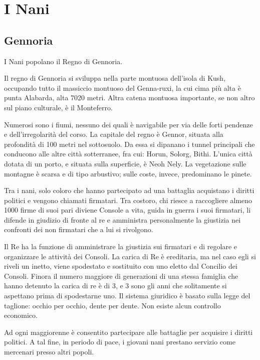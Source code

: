 \section{I Nani}

\subsection{Gennoria}


I Nani popolano il Regno di Gennoria.

\Geografia Il regno di Gennoria si sviluppa nella parte montuosa dell'isola di
Kush, occupando tutto il massiccio montuoso del Genna-ruxi, la cui
cima pi\`u alta \`e punta Alabarda, alta 7020 metri. Altra catena
montuosa importante, se non altro sul piano culturale, \`e il
Monteferro.

Numerosi sono i fiumi, nessuno dei quali \`e navigabile per via
delle forti pendenze e dell'irregolarit\`a del corso. La capitale
del regno \`e Gennor, situata alla profondit\`a di 100 metri nel
sottosuolo. Da essa si dipanano i tunnel principali che conducono alle
altre citt\`a sotterranee, fra cui: Horun, Solorg, Bithi. L'unica
citt\`a dotata di un porto, e situata sulla superficie, \`e Neoh
Nely. La vegetazione sulle montagne \`e scarsa e di tipo arbustivo;
sulle coste, invece, predominano le pinete.

\Politica Tra i nani, solo coloro che hanno partecipato ad una battaglia
acquistano i diritti politici e vengono chiamati firmatari. Tra
costoro, chi riesce a raccogliere almeno 1000 firme di suoi pari
diviene Console a vita, guida in guerra i suoi firmatari, li difende
in giudizio di fronte al re e amministra personalmente la giustizia
nei confronti dei non firmatari che a lui si rivolgono. 

Il Re ha la funzione di amministrare la giustizia sui firmatari e di
regolare e organizzare le attivit\`a dei Consoli. La carica di Re
\`e ereditaria, ma nel caso egli si riveli un inetto, viene
spodestato e sostituito con uno eletto dal Concilio dei Consoli.
Finora il numero maggiore di generazioni di una stessa famiglia che
hanno detenuto la carica di re \`e di 3, e 3 sono gli anni che
solitamente si aspettano prima di spodestarne uno. Il sistema
giuridico \`e basato sulla legge del taglione: occhio per occhio,
dente per dente.  Non esiste alcun controllo economico.

\Esercito Ad ogni maggiorenne \`e consentito partecipare alle battaglie per
acquisire i diritti politici. A tal fine, in periodo di pace,
i giovani nani prestano servizio come mercenari presso altri popoli.

